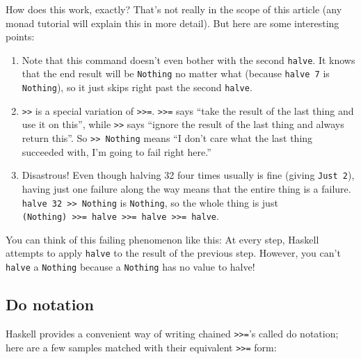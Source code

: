 \documentclass[]{article}
\begin{document}
How does this work, exactly? That's not really in the scope of this
article (any monad tutorial will explain this in more detail). But here
are some interesting points:

\begin{enumerate}
\def\labelenumi{\arabic{enumi}.}
\tightlist
\item
  Note that this command doesn't even bother with the second
  \texttt{halve}. It knows that the end result will be \texttt{Nothing}
  no matter what (because \texttt{halve\ 7} is \texttt{Nothing}), so it
  just skips right past the second \texttt{halve}.
\item
  \texttt{\textgreater{}\textgreater{}} is a special variation of
  \texttt{\textgreater{}\textgreater{}=}.
  \texttt{\textgreater{}\textgreater{}=} says ``take the result of the
  last thing and use it on this'', while
  \texttt{\textgreater{}\textgreater{}} says ``ignore the result of the
  last thing and always return this''. So
  \texttt{\textgreater{}\textgreater{}\ Nothing} means ``I don't care
  what the last thing succeeded with, I'm going to fail right here.''
\item
  Disastrous! Even though halving 32 four times usually is fine (giving
  \texttt{Just\ 2}), having just one failure along the way means that
  the entire thing is a failure.
  \texttt{halve\ 32\ \textgreater{}\textgreater{}\ Nothing} is
  \texttt{Nothing}, so the whole thing is just
  \texttt{(Nothing)\ \textgreater{}\textgreater{}=\ halve\ \textgreater{}\textgreater{}=\ halve\ \textgreater{}\textgreater{}=\ halve}.
\end{enumerate}

You can think of this failing phenomenon like this: At every step,
Haskell attempts to apply \texttt{halve} to the result of the previous
step. However, you can't \texttt{halve} a \texttt{Nothing} because a
\texttt{Nothing} has no value to halve!

\subsection{Do notation}\label{do-notation}

Haskell provides a convenient way of writing chained
\texttt{\textgreater{}\textgreater{}=}'s called do notation; here are a
few samples matched with their equivalent
\texttt{\textgreater{}\textgreater{}=} form:
\end{document}
